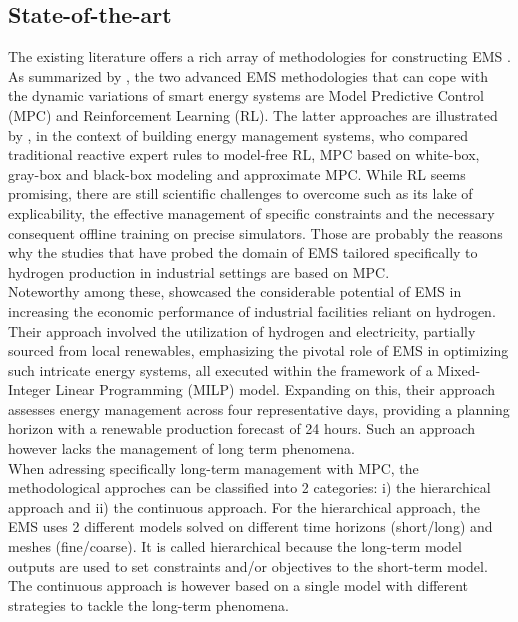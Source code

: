 \subsection{State-of-the-art}
The existing literature offers a rich array of methodologies for constructing EMS \citep{weitzel_energy_2018}. As summarized by \cite{alabi_strategic_2023}, the two advanced EMS methodologies that can cope with the dynamic variations of smart energy systems are Model Predictive Control (MPC) and Reinforcement Learning (RL). The latter approaches are illustrated by \cite{stoffel_evaluation_2023}, in the context of building energy management systems, who compared traditional reactive expert rules to model-free RL, MPC based on white-box, gray-box and black-box modeling and approximate MPC. While RL seems promising, there are still scientific challenges to overcome such as its lake of explicability, the effective management of specific constraints and the necessary consequent offline training on precise simulators. Those are probably the reasons why the studies that have probed the domain of EMS tailored specifically to hydrogen production in industrial settings are based on MPC.
\\
Noteworthy among these, \cite{klyapovskiy_optimal_2021} showcased the considerable potential of EMS in increasing the economic performance of industrial facilities reliant on hydrogen. Their approach involved the utilization of hydrogen and electricity, partially sourced from local renewables, emphasizing the pivotal role of EMS in optimizing such intricate energy systems, all executed within the framework of a Mixed-Integer Linear Programming (MILP) model. Expanding on this, their approach assesses energy management across four representative days, providing a planning horizon with a renewable production forecast of 24 hours. Such an approach however lacks the management of long term phenomena.
\\
When adressing specifically long-term management with MPC, the methodological approches can be classified into 2 categories: i) the hierarchical approach and ii) the continuous approach. For the hierarchical approach, the EMS uses 2 different models solved on different time horizons (short/long) and meshes (fine/coarse). It is called hierarchical because the long-term model outputs are used to set constraints and/or objectives to the short-term model. The continuous approach is however based on a single model with different strategies to tackle the long-term phenomena.\\

